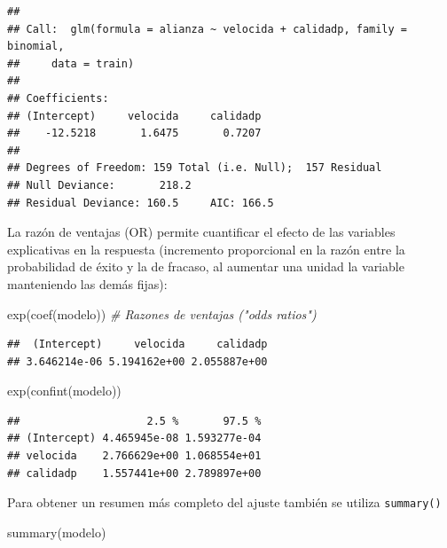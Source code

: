 \documentclass[
]{book}
\newenvironment{Shaded}{\begin{snugshade}}{\end{snugshade}}
\newcommand{\CommentTok}[1]{\textcolor[rgb]{0.56,0.35,0.01}{\textit{#1}}}
\newcommand{\FunctionTok}[1]{\textcolor[rgb]{0.00,0.00,0.00}{#1}}
\newcommand{\NormalTok}[1]{#1}
\theoremstyle{break}
\theoremstyle{definition}
\theoremstyle{definition}
\theoremstyle{definition}
\theoremstyle{definition}
\theoremstyle{remark}
\begin{document}
\begin{verbatim}
## 
## Call:  glm(formula = alianza ~ velocida + calidadp, family = binomial, 
##     data = train)
## 
## Coefficients:
## (Intercept)     velocida     calidadp  
##    -12.5218       1.6475       0.7207  
## 
## Degrees of Freedom: 159 Total (i.e. Null);  157 Residual
## Null Deviance:       218.2 
## Residual Deviance: 160.5     AIC: 166.5
\end{verbatim}

La razón de ventajas (OR) permite cuantificar el efecto de las variables explicativas en la respuesta (incremento proporcional en la razón entre la probabilidad de éxito y la de fracaso, al aumentar una unidad la variable manteniendo las demás fijas):

\begin{Shaded}
\begin{Highlighting}[]
\FunctionTok{exp}\NormalTok{(}\FunctionTok{coef}\NormalTok{(modelo))  }\CommentTok{\# Razones de ventajas ("odds ratios")}
\end{Highlighting}
\end{Shaded}

\begin{verbatim}
##  (Intercept)     velocida     calidadp 
## 3.646214e-06 5.194162e+00 2.055887e+00
\end{verbatim}

\begin{Shaded}
\begin{Highlighting}[]
\FunctionTok{exp}\NormalTok{(}\FunctionTok{confint}\NormalTok{(modelo))}
\end{Highlighting}
\end{Shaded}

\begin{verbatim}
##                    2.5 %       97.5 %
## (Intercept) 4.465945e-08 1.593277e-04
## velocida    2.766629e+00 1.068554e+01
## calidadp    1.557441e+00 2.789897e+00
\end{verbatim}

Para obtener un resumen más completo del ajuste también se utiliza \texttt{summary()}

\begin{Shaded}
\begin{Highlighting}[]
\FunctionTok{summary}\NormalTok{(modelo)}
\end{Highlighting}
\end{Shaded}
\end{document}
